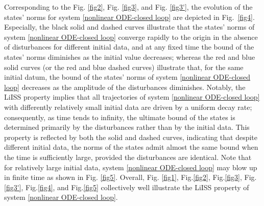 \documentclass[onecolumn]{autart}
\newenvironment{proof of Prop.ODE}{{\it Proof of Proposition~\ref{Prop.ODE}:\enspace}}{\hfill $\blacksquare$\par}
\newenvironment{proof of PDE}{{\it Proof of Proposition \ref{Prop.8}:\enspace}}{\hfill $\blacksquare$\par}
\begin{document}
{	Corresponding to the Fig. \ref{fig2},  Fig. \ref{fig3}, and Fig. \ref{fig3'}, the evolution of the states' norms for system \eqref{nonlinear ODE-closed loop} are depicted in Fig.~\ref{fig4}. Especially,  the black solid and dashed {curves}  illustrate  that the states' norms of system \eqref{nonlinear ODE-closed loop}   converge   rapidly to   the origin in the absence of disturbances for different initial data,  and   at any fixed time   the bound of the  states' norms diminishes as the initial value decreases; whereas the red and blue solid {curves} (or the red and blue dashed {curves}) illustrate that, for the same initial datum, the bound of the states' norms of   system \eqref{nonlinear ODE-closed loop} decreases as the amplitude of the disturbances diminishes. Notably, the LiISS property implies that all trajectories of system \eqref{nonlinear ODE-closed loop} with differently relatively small initial data
	are driven by a uniform decay rate; consequently, as time tends to infinity, the ultimate bound of  the states is  determined primarily by the disturbances rather than by the initial data.  This property is reflected by both the solid and dashed {curves}, indicating that despite different initial data,   the norms of the states admit  {almost the same bound} when the time is sufficiently large, provided the disturbances are identical. Note that for relatively large initial data, system \eqref{nonlinear ODE-closed loop} may blow up in finite time as shown in Fig. \ref{fig5}. Overall, Fig. \ref{fig1}, Fig.\ref{fig2}, Fig.\ref{fig3},  Fig. \ref{fig3'},   Fig.\ref{fig4}, and Fig.\ref{fig5} collectively well illustrate the LiISS property of   system \eqref{nonlinear ODE-closed loop}.

}
\end{document}
